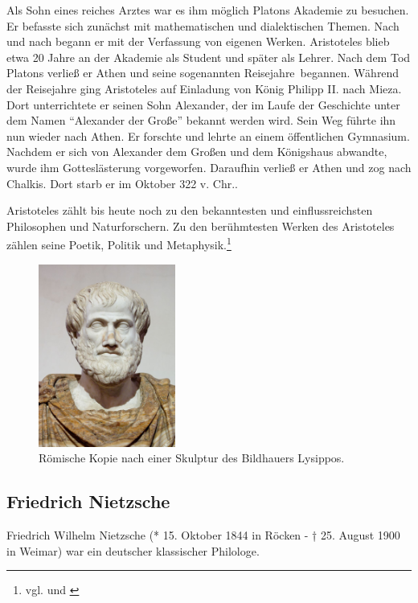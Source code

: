 Als Sohn eines reiches Arztes war es ihm möglich Platons Akademie zu besuchen. Er befasste sich zunächst mit mathematischen und dialektischen Themen. Nach und nach begann er mit der Verfassung von eigenen Werken. Aristoteles blieb etwa 20 Jahre an der Akademie als Student und später als Lehrer. Nach dem Tod Platons verließ er Athen und seine sogenannten \glqq Reisejahre\grqq\ begannen. 
Während der Reisejahre ging Aristoteles auf Einladung von König Philipp II. nach Mieza. 
Dort unterrichtete er seinen Sohn Alexander, der im Laufe der Geschichte unter dem Namen \enquote{Alexander der Große} bekannt werden wird. Sein Weg führte ihn nun wieder nach Athen. Er forschte und lehrte an einem öffentlichen Gymnasium. Nachdem er sich von Alexander dem Großen und dem Königshaus abwandte, wurde ihm Gotteslästerung vorgeworfen. Daraufhin verließ er Athen und zog nach Chalkis. Dort starb er im Oktober 322 v. Chr.. 

Aristoteles zählt bis heute noch zu den bekanntesten und einflussreichsten Philosophen und Naturforschern. Zu den berühmtesten Werken des Aristoteles zählen seine Poetik, Politik und Metaphysik.\footnote{vgl. \cite{Aristoteles1} und \cite{Aristoteles2}}
\begin{figure}[H]
\centering 
 \includegraphics[width=0.4\textwidth]{Bilder/kap3/Aristoteles} 
 \caption{Römische Kopie nach einer Skulptur des Bildhauers Lysippos.\cite{WikiAR}  \label{portraitAristotles}}
\end{figure}

\subsection{Friedrich Nietzsche}
Friedrich Wilhelm Nietzsche (* 15. Oktober 1844 in Röcken - † 25. August 1900 in Weimar) war ein deutscher klassischer Philologe.

